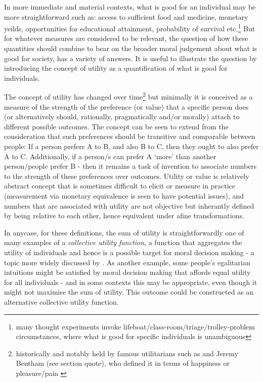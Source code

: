 In more immediate and material contexts, what is good for an individual may be more straightforward such as: access to sufficient food and medicine, monetary yeilds, opportunities for educational attainment, probability of survival etc.\footnote{many thought experiments invoke lifeboat/class-room/triage/trolley-problem circumstances, where what is good for specific individuals is unambiguous}
But for whatever measures are considered to be relevant, the question of how these quantities should combine to bear on the broader moral judgement about what is good for society, has a variety of answers.
It is useful to illustrate the question by introducing the concept of utility as a quantification of what is good for individuals.

The concept of utility has changed over time\footnote{historically and notably held by famous utilitarians such as \cite{MillGutenberg} and Jeremy Bentham (see section quote), who defined it in terms of happiness or pleasure/pain \citep{bentham1823introduction}}
but minimally it is conceived as a measure of the strength of the preference (or value) that a specific person does (or alternatively should, rationally, pragmatically and/or morally) attach to different possible outcomes.
The concept can be seen to extend from the consideration that such preferences should be transitive and comparable between people: If a person prefers A to B, and also B to C, then they ought to also prefer A to C. Additionally, if a person/s can prefer A `more' than another person/people prefer B - then it remains a task of invention to associate numbers to the strength of these preferences over outcomes.
Utility or value is relatively abstract concept that is sometimes difficult to elicit or measure in practice (measurement via monetary equivalence is seen to have potential issues), and numbers that are associated with utility are not objective but inherantly defined by being relative to each other, hence equivalent under afine transformations.

In anycase, for these definitions, the sum of utility is straightforwardly one of many examples of a \textit{collective utility function}, a function that aggregates the utility of individuals and hence is a possible target for moral decision making - a topic more widely discussed by \cite{TheoriesofValueAggregation}.
As another example, some people's egalitarian intuitions might be satisfied by moral decision making that affords equal utility for all individuals - and in some contexts this may be appropriate, even though it might not maximise the sum of utility. This outcome could be constructed as an alternative collective utility function.

